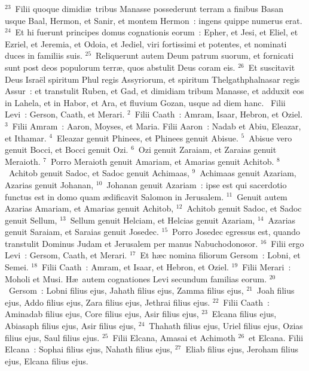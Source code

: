 ${}^{23}$~Filii quoque dimidi\ae\ tribus Manasse possederunt terram a finibus Basan usque Baal, Hermon, et Sanir, et montem Hermon~: ingens quippe numerus erat.
${}^{24}$~Et hi fuerunt principes domus cognationis eorum~: Epher, et Jesi, et Eliel, et Ezriel, et Jeremia, et Odoia, et Jediel, viri fortissimi et potentes, et nominati duces in familiis suis.
${}^{25}$~Reliquerunt autem Deum patrum suorum, et fornicati sunt post deos populorum terr\ae , quos abstulit Deus coram eis.
${}^{26}$~Et suscitavit Deus Isra\"el spiritum Phul regis Assyriorum, et spiritum Thelgathphalnasar regis Assur~: et transtulit Ruben, et Gad, et dimidiam tribum Manasse, et adduxit eos in Lahela, et in Habor, et Ara, et fluvium Gozan, usque ad diem hanc.
~Filii Levi~: Gerson, Caath, et Merari.
${}^{2}$~Filii Caath~: Amram, Isaar, Hebron, et Oziel.
${}^{3}$~Filii Amram~: Aaron, Moyses, et Maria. Filii Aaron~: Nadab et Abiu, Eleazar, et Ithamar.
${}^{4}$~Eleazar genuit Phinees, et Phinees genuit Abisue.
${}^{5}$~Abisue vero genuit Bocci, et Bocci genuit Ozi.
${}^{6}$~Ozi genuit Zaraiam, et Zaraias genuit Meraioth.
${}^{7}$~Porro Meraioth genuit Amariam, et Amarias genuit Achitob.
${}^{8}$~Achitob genuit Sadoc, et Sadoc genuit Achimaas,
${}^{9}$~Achimaas genuit Azariam, Azarias genuit Johanan,
${}^{10}$~Johanan genuit Azariam~: ipse est qui sacerdotio functus est in domo quam \ae dificavit Salomon in Jerusalem.
${}^{11}$~Genuit autem Azarias Amariam, et Amarias genuit Achitob,
${}^{12}$~Achitob genuit Sadoc, et Sadoc genuit Sellum,
${}^{13}$~Sellum genuit Helciam, et Helcias genuit Azariam,
${}^{14}$~Azarias genuit Saraiam, et Saraias genuit Josedec.
${}^{15}$~Porro Josedec egressus est, quando transtulit Dominus Judam et Jerusalem per manus Nabuchodonosor.
${}^{16}$~Filii ergo Levi~: Gersom, Caath, et Merari.
${}^{17}$~Et h\ae c nomina filiorum Gersom~: Lobni, et Semei.
${}^{18}$~Filii Caath~: Amram, et Isaar, et Hebron, et Oziel.
${}^{19}$~Filii Merari~: Moholi et Musi. H\ae\ autem cognationes Levi secundum familias eorum.
${}^{20}$~Gersom~: Lobni filius ejus, Jahath filius ejus, Zamma filius ejus,
${}^{21}$~Joah filius ejus, Addo filius ejus, Zara filius ejus, Jethrai filius ejus.
${}^{22}$~Filii Caath~: Aminadab filius ejus, Core filius ejus, Asir filius ejus,
${}^{23}$~Elcana filius ejus, Abiasaph filius ejus, Asir filius ejus,
${}^{24}$~Thahath filius ejus, Uriel filius ejus, Ozias filius ejus, Saul filius ejus.
${}^{25}$~Filii Elcana, Amasai et Achimoth
${}^{26}$~et Elcana. Filii Elcana~: Sophai filius ejus, Nahath filius ejus,
${}^{27}$~Eliab filius ejus, Jeroham filius ejus, Elcana filius ejus.
